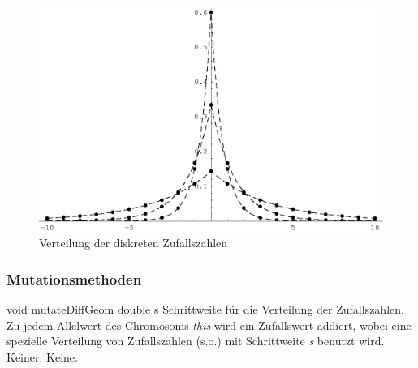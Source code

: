 \documentclass{report}
\begin{document}
\begin{figure}[ht]
    \vspace*{-30ex}
    \centerline{
        \hfill
        \includegraphics[width=\textwidth]{diffGeom.eps}
        \hfill
    }
    \vspace*{-30ex}
    \caption[Verteilung diskreter Zufallszahlen]{
        \label{verteilung}
        Verteilung der diskreten Zufallszahlen
    }
\end{figure}

\newpage
\subsubsection{Mutationsmethoden}

\setNormalInstance
\printMethodWithOneParam
{void}
{mutateDiffGeom}
{double}
{s}
{Schrittweite f\"ur die Verteilung der Zufallszahlen.}
{Zu jedem Allelwert des Chromosoms {\em this} wird ein Zufallswert addiert, wobei
 eine spezielle Verteilung von Zufallszahlen (s.o.) mit Schrittweite
 {\em s} benutzt wird.}
{Keiner.}
{Keine.}

\vspace{4ex}
\end{document}

